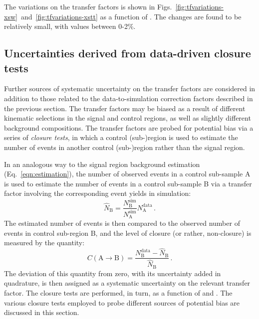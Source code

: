The variations on the \Tmutottw transfer factors is shown in 
Figs.~\ref{fig:tfvariations-xsw}~and~\ref{fig:tfvariations-xstt} as a function 
of \njnbht. The changes are found to be relatively small, with values between 
0-2\%.


\subsection{Uncertainties derived from data-driven closure tests}
\label{sec:analysis-systematics-data}
Further sources of systematic uncertainty on the transfer factors are 
considered in addition to those related to the data-to-simulation correction 
factors described in the previous section. The transfer factors may be biased 
as a result of different kinematic selections in the signal and control 
regions, as well as slightly different background compositions. The transfer 
factors are probed for potential bias via a series of \textit{closure tests}, 
in which a control (sub-)region is used to estimate the number of events in 
another control (sub-)region rather than the signal region.

In an analogous way to the signal region background estimation 
(Eq.~\ref{eqn:estimation}), the number of observed events in a control 
sub-sample A is used to estimate the number of events in a control sub-sample 
B via a transfer factor involving the corresponding event yields in simulation:
\begin{equation}
\label{eqn:closuretest}
\hat{N}_\mathrm{B} = 
\frac{N_\mathrm{B}^\mathrm{sim}}{N_\mathrm{A}^\mathrm{sim}}
N_\mathrm{A}^\mathrm{data} \, .
\end{equation}
The estimated number of events is then compared to the observed number of 
events in control sub-region B, and the level 
of closure (or rather, non-closure) is measured by the quantity:
\begin{equation}
C(\mathrm{A}\rightarrow\mathrm{B}) = \frac{N_\mathrm{B}^\mathrm{data} - 
\hat{N}_\mathrm{B}}{\hat{N}_\mathrm{B}} \, .
\end{equation}
The deviation of this quantity from zero, with its uncertainty added in 
quadrature, is then assigned as a systematic uncertainty on the relevant 
transfer factor. The closure tests are performed, in turn, as a function of 
\scalht and \njet. The various closure tests employed to probe different 
sources of potential bias are discussed in this section.

